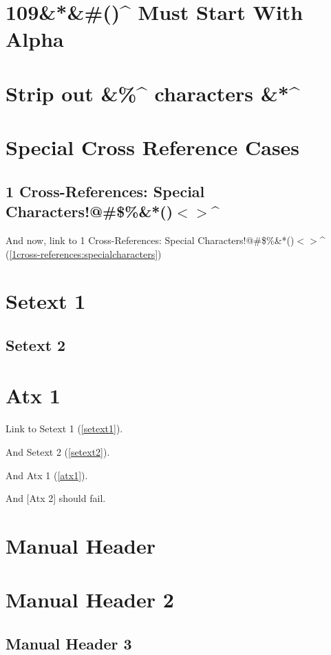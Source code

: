 
\def\mytitle{MultiMarkdown Autoreference Test}
\def\latexmode{memoir}


\chapter{109\&*\&\#()\^{} Must Start With Alpha}
\label{109muststartwithalpha}

\chapter{Strip out \&\%\^{} characters \&*\^{}}
\label{stripoutcharacters}

\chapter{Special Cross Reference Cases}
\label{specialcrossreferencecases}

\section{1 Cross-{}References: Special Characters!@\#\$\%\&*()$<$$>$\^{}}
\label{1cross-references:specialcharacters}

And now, link to 1 Cross-{}References: Special Characters!@\#\$\%\&*()$<$$>$\^{} (\autoref{1cross-references:specialcharacters})

\chapter{Setext 1}
\label{setext1}

\section{Setext 2}
\label{setext2}

\chapter{Atx 1}
\label{atx1}

Link to Setext 1 (\autoref{setext1}).

And Setext 2 (\autoref{setext2}).

And Atx 1 (\autoref{atx1}).

And [Atx 2] should fail.

\chapter{Manual Header}
\label{label}

\chapter{Manual Header 2}
\label{label2}

\section{Manual Header 3}
\label{label3}




